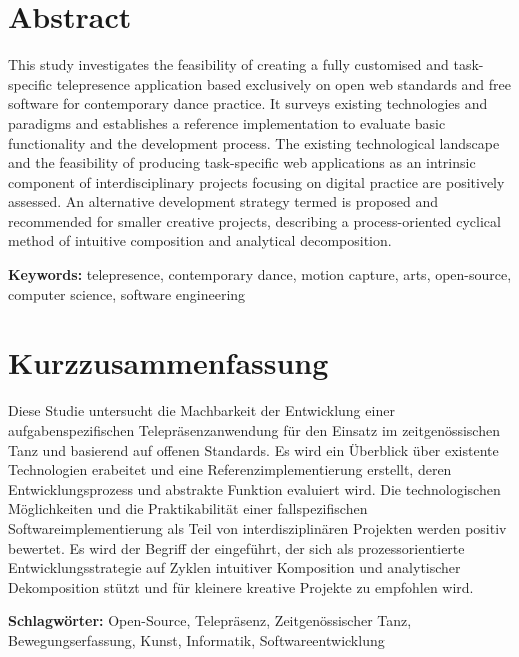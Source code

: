 \section*{Abstract}

This study investigates the feasibility of creating a fully customised and task-specific telepresence application based exclusively on open web standards and free software for contemporary dance practice.
It surveys existing technologies and paradigms and establishes a reference implementation to evaluate basic functionality and the development process.
The existing technological landscape and the feasibility of producing task-specific web applications as an intrinsic component of interdisciplinary projects focusing on digital practice are positively assessed.
An alternative development strategy termed  is proposed and recommended for smaller creative projects, describing a process-oriented cyclical method of intuitive composition and analytical decomposition.

\textbf{Keywords:} telepresence, contemporary dance, motion capture, arts, open-source, computer science, software engineering


\section*{Kurzzusammenfassung}

Diese Studie untersucht die Machbarkeit der Entwicklung einer aufgabenspezifischen Telepräsenzanwendung für den Einsatz im zeitgenössischen Tanz und basierend auf offenen Standards.
Es wird ein Überblick über existente Technologien erabeitet und eine Referenzimplementierung erstellt, deren Entwicklungsprozess und abstrakte Funktion evaluiert wird.
Die technologischen Möglichkeiten und die Praktikabilität einer fallspezifischen Softwareimplementierung als Teil von interdisziplinären Projekten werden positiv bewertet.
Es wird der Begriff der  eingeführt, der sich als prozessorientierte Entwicklungsstrategie auf Zyklen intuitiver Komposition und analytischer Dekomposition stützt und für kleinere kreative Projekte zu empfohlen wird.
 
 \textbf{Schlagwörter:} Open-Source, Telepräsenz, Zeitgenössischer Tanz, Bewegungserfassung, Kunst, Informatik, Softwareentwicklung
 
